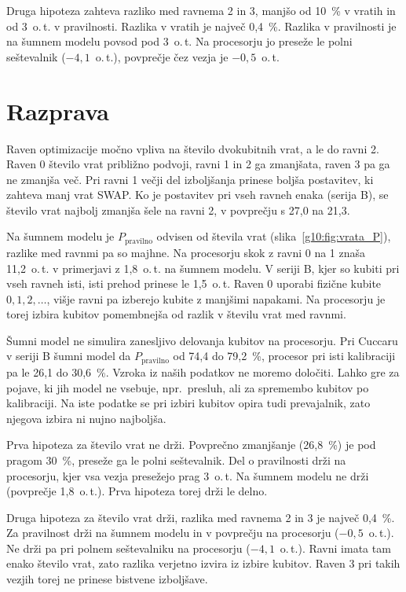 Druga hipoteza zahteva razliko med ravnema 2 in 3,
manjšo od 10~\% v vratih
in od 3~o.\,t. v pravilnosti.
Razlika v vratih je največ 0,4~\%.
Razlika v pravilnosti je na šumnem modelu
povsod pod 3~o.\,t.
Na procesorju jo preseže le polni seštevalnik ($-4{,}1$~o.\,t.),
povprečje čez vezja je $-0{,}5$~o.\,t.


\section{Razprava}
\label{g10:sec:razprava}

Raven optimizacije močno vpliva na število dvokubitnih vrat,
a le do ravni 2.
Raven 0 število vrat približno podvoji,
ravni 1 in 2 ga zmanjšata,
raven 3 pa ga ne zmanjša več.
Pri ravni 1 večji del izboljšanja prinese
boljša postavitev, ki zahteva manj vrat SWAP.
Ko je postavitev pri vseh ravneh enaka (serija B),
se število vrat najbolj zmanjša šele na ravni 2,
v povprečju s 27,0 na 21,3.

Na šumnem modelu je $P_\text{pravilno}$ odvisen od števila vrat
(slika~\ref{g10:fig:vrata_P}),
razlike med ravnmi pa so majhne.
Na procesorju skok z ravni 0 na 1 znaša 
11,2~o.\,t. v primerjavi z 1,8~o.\,t. na šumnem modelu.
V seriji B, kjer so kubiti pri vseh ravneh isti,
isti prehod prinese le 1,5~o.\,t.
Raven 0 uporabi fizične kubite $0, 1, 2, \ldots$,
višje ravni pa izberejo kubite z manjšimi napakami.
Na procesorju je torej izbira kubitov
pomembnejša od razlik v številu vrat med ravnmi.

Šumni model ne simulira zanesljivo delovanja kubitov
na procesorju.
Pri Cuccaru v seriji B šumni model da
$P_\text{pravilno}$ od 74,4 do 79,2~\%,
procesor pri isti kalibraciji pa le 26,1 do 30,6~\%.
Vzroka iz naših podatkov ne moremo določiti.
Lahko gre za pojave, ki jih model ne vsebuje,
npr.\ presluh, ali za spremembo kubitov po kalibraciji.
Na iste podatke se pri izbiri kubitov opira
tudi prevajalnik, zato njegova izbira ni nujno najboljša.

Prva hipoteza za število vrat ne drži.
Povprečno zmanjšanje (26,8~\%) je pod pragom 30~\%,
preseže ga le polni seštevalnik.
Del o pravilnosti drži na procesorju,
kjer vsa vezja presežejo prag 3~o.\,t.
Na šumnem modelu ne drži (povprečje 1,8~o.\,t.).
Prva hipoteza torej drži le delno.

Druga hipoteza za število vrat drži,
razlika med ravnema 2 in 3 je največ 0,4~\%.
Za pravilnost drži na šumnem modelu
in v povprečju na procesorju ($-0{,}5$~o.\,t.).
Ne drži pa pri polnem seštevalniku na procesorju ($-4{,}1$~o.\,t.).
Ravni imata tam enako število vrat,
zato razlika verjetno izvira iz izbire kubitov.
Raven 3 pri takih vezjih
torej ne prinese bistvene izboljšave.

